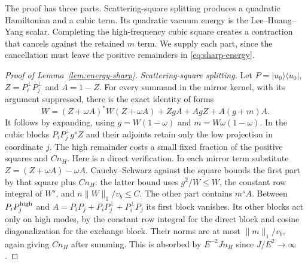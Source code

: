 The proof has three parts.  Scattering-square splitting produces a
quadratic Hamiltonian and a cubic term.  Its quadratic vacuum energy is
the Lee--Huang--Yang scalar.  Completing the high-frequency cubic square
creates a contraction that cancels against the retained $m$ term.
We supply each part, since the cancellation must leave the positive
remainders in \eqref{eq:sharp-energy}.

\begin{proof}[Proof of Lemma~\ref{lem:energy-sharp}]
\emph{Scattering-square splitting.}
Let $P=|u_0\rangle\langle u_0|$, $Z=P_i^\perp P_j^\perp$ and $A=1-Z$.
For every summand in the mirror kernel, with its argument suppressed,
there is the exact identity of forms
\begin{equation}\label{eq:energy-scattering-square}
 W=(Z+\omega A)^*W(Z+\omega A)+ZgA+AgZ+A(g+m)A.
\end{equation}
It follows by expanding, using $g=W(1-\omega)$ and
$m=W\omega(1-\omega)$.
In the cubic blocks $P_iP_j^\perp g^sZ$ and their adjoints retain only
the low projection in coordinate $j$.  The high remainder costs a small
fixed fraction of the positive squares and $Cn_H$.  Here is a direct
verification.  In each mirror term substitute
$Z=(Z+\omega A)-\omega A$.  Cauchy--Schwarz against the square bounds
the first part by that square plus $Cn_H$: the latter bound uses
$g^2/W\le W$, the constant row integral of $W^s$, and
$n\|W\|_1/v_b\le C$.  The other part contains $m^sA$.
Between $P_iP_j^{\rm high}$ and
$A=P_iP_j+P_iP_j^\perp+P_i^\perp P_j$ its first block vanishes.
Its other blocks act only on high modes, by the constant row integral
for the direct block and cosine diagonalization for the exchange block.
Their norms are at most $\|m\|_1/v_b$, again giving $Cn_H$ after summing.
This is absorbed by $E^{-2}Jn_H$ since $J/E^2\to\infty$.


\end{proof}
